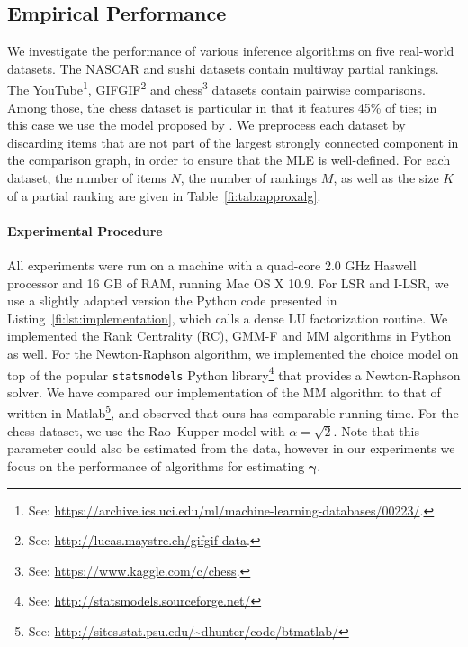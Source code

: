 \subsection{Empirical Performance}

We investigate the performance of various inference algorithms on five real-world datasets.
The NASCAR \citep{hunter2004mm} and sushi \citep{kamishima2009efficient} datasets contain multiway partial rankings.
The YouTube\footnote{%
See: \url{https://archive.ics.uci.edu/ml/machine-learning-databases/00223/}.},
GIFGIF\footnote{%
See: \url{http://lucas.maystre.ch/gifgif-data}.}
and chess\footnote{%
See: \url{https://www.kaggle.com/c/chess}.}
datasets contain pairwise comparisons.
Among those, the chess dataset is particular in that it features 45\% of ties;
in this case we use the model proposed by \citet{rao1967ties}.
We preprocess each dataset by discarding items that are not part of the largest strongly connected component in the comparison graph, in order to ensure that the MLE is well-defined.
For each dataset, the number of items $N$, the number of rankings $M$, as well as the size $K$ of a partial ranking are given in Table~\ref{fi:tab:approxalg}.

\paragraph{Experimental Procedure}
All experiments were run on a machine with a quad-core 2.0 GHz Haswell processor and 16 GB of RAM, running Mac OS X 10.9.
For LSR and I-LSR, we use a slightly adapted version the Python code presented in Listing~\ref{fi:lst:implementation}, which calls a dense LU factorization routine.
We implemented the Rank Centrality (RC), GMM-F and MM \citep{hunter2004mm} algorithms in Python as well.
For the Newton-Raphson algorithm, we implemented the choice model on top of the popular \texttt{statsmodels} Python library\footnote{%
See: \url{http://statsmodels.sourceforge.net/}
} that provides a Newton-Raphson solver.
We have compared our implementation of the MM algorithm to that of \citeauthor{hunter2004mm} written in Matlab\footnote{%
See: \url{http://sites.stat.psu.edu/~dhunter/code/btmatlab/}
}, and observed that ours has comparable running time.
For the chess dataset, we use the Rao--Kupper model with $\alpha = \sqrt{2}$.
Note that this parameter could also be estimated from the data, however in our experiments we focus on the performance of algorithms for estimating $\bm{\gamma}$.

